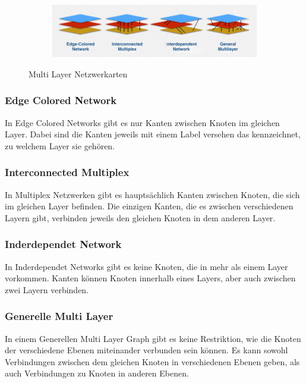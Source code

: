 \begin{figure}
  \centering
  \begin{subfigure}[b]{1.0\textwidth}
    \includegraphics[width=1.0\linewidth]{img/network_types.png}
  \end{subfigure}
  \caption{Multi Layer Netzwerkarten \cite{muxVizBild}}
  \label{network_types}
\end{figure}

\subsubsection{Edge Colored Network}

In Edge Colored Networks gibt es nur Kanten zwischen Knoten im gleichen Layer. Dabei sind die Kanten jeweils mit einem Label versehen das kennzeichnet, zu welchem Layer sie gehören.


\subsubsection{Interconnected Multiplex}

In Multiplex Netzwerken gibt es hauptsächlich Kanten zwischen Knoten, die sich im gleichen Layer befinden. Die einzigen Kanten, die es zwischen verschiedenen Layern gibt, verbinden jeweils den gleichen Knoten in dem anderen Layer. 

\subsubsection{Inderdependet Network}

In Inderdependet Networks gibt es keine Knoten, die in mehr als einem Layer vorkommen. Kanten können Knoten innerhalb eines Layers, aber auch zwischen zwei Layern verbinden.

\subsubsection{Generelle Multi Layer}
In einem Generellen Multi Layer Graph gibt es keine Restriktion, wie die Knoten der verschiedene Ebenen miteinander verbunden sein können. Es kann sowohl Verbindungen zwischen dem gleichen Knoten in verschiedenen Ebenen geben, als auch Verbindungen zu Knoten in anderen Ebenen.


